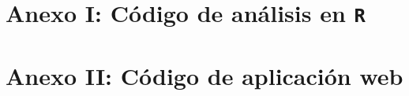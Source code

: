 \documentclass[a4paper, 12pt]{bookln9}
\begin{document}
	\tableofcontents
		
	
	
	
	
	
	
	
	
	
    
	
	
	
	
	
	\newpage
	
	\thispagestyle{empty}
	
	
	\appendix
	\backmatter
	\chapter{Anexo I: Código de análisis en \texttt{R}}
	
	\chapter{Anexo II: Código de aplicación web}
	
		
\end{document}
